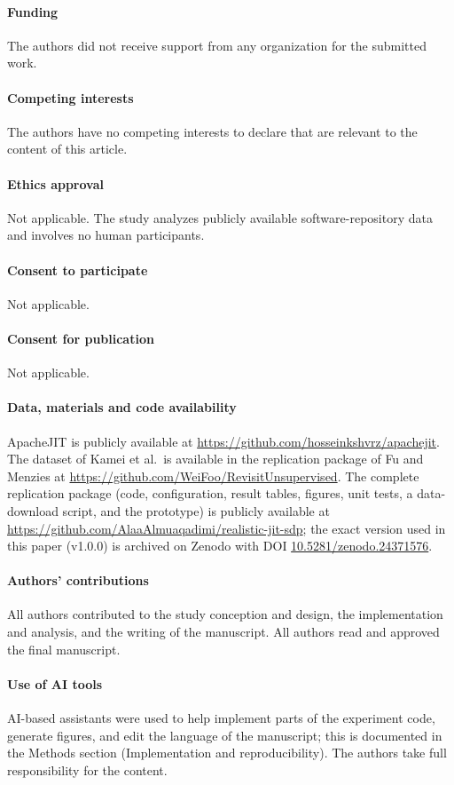 \documentclass[11pt,a4paper]{article}
\begin{document}
\paragraph{Funding} The authors did not receive support from any organization for the submitted work.

\paragraph{Competing interests} The authors have no competing interests to declare that are relevant to the content of this article.

\paragraph{Ethics approval} Not applicable. The study analyzes publicly available software-repository data and involves no human participants.

\paragraph{Consent to participate} Not applicable.

\paragraph{Consent for publication} Not applicable.

\paragraph{Data, materials and code availability} ApacheJIT is publicly available at \url{https://github.com/hosseinkshvrz/apachejit}. The dataset of Kamei et al.\ is available in the replication package of Fu and Menzies at \url{https://github.com/WeiFoo/RevisitUnsupervised}. The complete replication package (code, configuration, result tables, figures, unit tests, a data-download script, and the prototype) is publicly available at \url{https://github.com/AlaaAlmuaqadimi/realistic-jit-sdp}; the exact version used in this paper (v1.0.0) is archived on Zenodo with DOI \href{https://doi.org/10.5281/zenodo.24371576}{10.5281/zenodo.24371576}.

\paragraph{Authors' contributions} All authors contributed to the study conception and design, the implementation and analysis, and the writing of the manuscript. All authors read and approved the final manuscript.

\paragraph{Use of AI tools} AI-based assistants were used to help implement parts of the experiment code, generate figures, and edit the language of the manuscript; this is documented in the Methods section (Implementation and reproducibility). The authors take full responsibility for the content.
\end{document}
